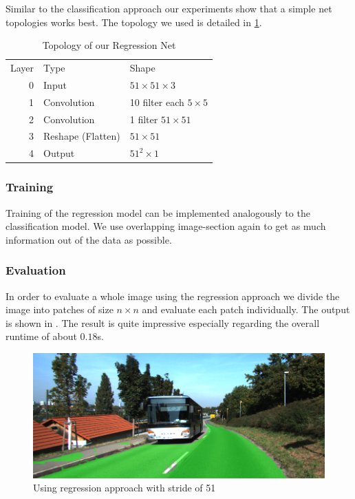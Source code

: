 Similar to the classification approach our experiments show that a simple net topologies works best. The topology we used is detailed in \cref{tab:topo2}.

\begin{table}[H]
	\normalsize
	\centering
	\begin{tabular}{r l l}
		Layer & Type  & Shape  \\
		0     & Input &  $51 \times 51 \times 3$ \\
		1     & Convolution & 10 filter  each $5 \times 5$ \\
		2     & Convolution & 1 filter $51 \times 51$  \\
		3     & Reshape (Flatten) & $51 \times 51$ \\
		4     & Output     & $51^2 \times 1$ \\
	\end{tabular}
	\caption{Topology of our Regression Net}
	\label{tab:topo2}
\end{table}

\subsubsection{Training}

Training of the regression model can be implemented analogously to the classification model. We use overlapping image-section again to get as much information out of the data as possible.

\subsubsection{Evaluation}

In order to evaluate a whole image using the regression approach we divide the image into patches of size $n \times n$ and evaluate each patch individually. The output is shown in . The result is quite impressive especially regarding the overall runtime of about $0.18$s.

\begin{figure}[]
	\centering
	\includegraphics[width=\columnwidth]{figures/models/testing2-um_32_conv_stride51.png}
	\caption{Using regression approach with stride of 51}
	\label{fig:reg_stride2}
\end{figure}


